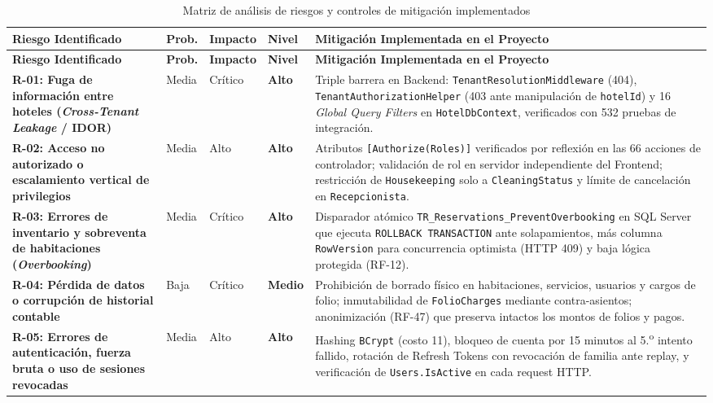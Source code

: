 \documentclass[12pt,a4paper]{article}
\begin{document}
\begin{longtable}{p{3.2cm} p{1.6cm} p{1.6cm} p{1.6cm} p{6.4cm}}
\caption{Matriz de an\'alisis de riesgos y controles de mitigaci\'on implementados}
\label{tab:matriz_riesgos}\\
\toprule
\textbf{Riesgo Identificado} & \textbf{Prob.} & \textbf{Impacto} & \textbf{Nivel} & \textbf{Mitigaci\'on Implementada en el Proyecto}\\
\midrule
\endfirsthead
\toprule
\textbf{Riesgo Identificado} & \textbf{Prob.} & \textbf{Impacto} & \textbf{Nivel} & \textbf{Mitigaci\'on Implementada en el Proyecto}\\
\midrule
\endhead
\bottomrule
\endfoot
\textbf{R-01: Fuga de informaci\'on entre hoteles (\textit{Cross-Tenant Leakage} / IDOR)} & Media & Cr\'itico & \textbf{Alto} & Triple barrera en Backend: \texttt{TenantResolutionMiddleware} (404), \texttt{TenantAuthorizationHelper} (403 ante manipulaci\'on de \texttt{hotelId}) y 16 \textit{Global Query Filters} en \texttt{HotelDbContext}, verificados con 532 pruebas de integraci\'on.\\[0.15cm]
\textbf{R-02: Acceso no autorizado o escalamiento vertical de privilegios} & Media & Alto & \textbf{Alto} & Atributos \texttt{[Authorize(Roles)]} verificados por reflexi\'on en las 66 acciones de controlador; validaci\'on de rol en servidor independiente del Frontend; restricci\'on de \texttt{Housekeeping} solo a \texttt{CleaningStatus} y l\'imite de cancelaci\'on en \texttt{Recepcionista}.\\[0.15cm]
\textbf{R-03: Errores de inventario y sobreventa de habitaciones (\textit{Overbooking})} & Media & Cr\'itico & \textbf{Alto} & Disparador at\'omico \texttt{TR\_Reservations\_PreventOverbooking} en SQL Server que ejecuta \texttt{ROLLBACK TRANSACTION} ante solapamientos, m\'as columna \texttt{RowVersion} para concurrencia optimista (HTTP 409) y baja l\'ogica protegida (RF-12).\\[0.15cm]
\textbf{R-04: P\'erdida de datos o corrupci\'on de historial contable} & Baja & Cr\'itico & \textbf{Medio} & Prohibici\'on de borrado f\'isico en habitaciones, servicios, usuarios y cargos de folio; inmutabilidad de \texttt{FolioCharges} mediante contra-asientos; anonimizaci\'on (RF-47) que preserva intactos los montos de folios y pagos.\\[0.15cm]
\textbf{R-05: Errores de autenticaci\'on, fuerza bruta o uso de sesiones revocadas} & Media & Alto & \textbf{Alto} & Hashing \texttt{BCrypt} (costo 11), bloqueo de cuenta por 15 minutos al 5.\textsuperscript{o} intento fallido, rotaci\'on de Refresh Tokens con revocaci\'on de familia ante replay, y verificaci\'on de \texttt{Users.IsActive} en cada request HTTP.\\[0.15cm]

\end{longtable}
\end{document}
